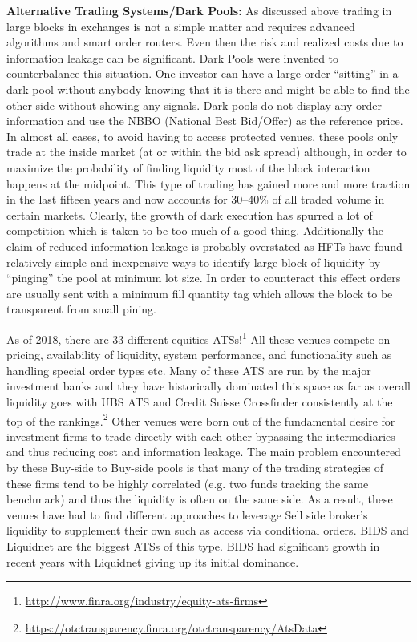 \noindent\textbf{Alternative Trading Systems/Dark Pools:} As discussed above trading in large blocks in exchanges is not a simple matter and requires advanced algorithms and smart order routers. Even then the risk and realized costs due to information leakage can be significant. Dark Pools were invented to counterbalance this situation. One investor can have a large order ``sitting'' in a dark pool without anybody knowing that it is there and might be able to find the other side without showing any signals. Dark pools do not display any order information and use the NBBO (National Best Bid/Offer) as the reference price. In almost all cases, to avoid having to access protected venues, these pools only trade at the inside market (at or within the bid ask spread) although, in order to maximize the probability of finding liquidity most of the block interaction happens at the midpoint. This type of trading has gained more and more traction in the last fifteen years and now accounts for 30--40\% of all traded volume in certain markets. Clearly, the growth of dark execution has spurred a lot of competition which is taken to be too much of a good thing. Additionally the claim of reduced information leakage is probably overstated as HFTs have found relatively simple and inexpensive ways to identify large block of liquidity by ``pinging'' the pool at minimum lot size. In order to counteract this effect orders are usually sent with a minimum fill quantity tag which allows the block to be transparent from small pining.

As of 2018, there are 33 different equities ATSs!\footnote{\url{http://www.finra.org/industry/equity-ats-firms}} All these venues compete on pricing, availability of liquidity, system performance, and functionality such as handling special order types etc. Many of these ATS are run by the major investment banks and they have historically dominated this space as far as overall liquidity goes with UBS ATS and Credit Suisse Crossfinder consistently at the top of the rankings.\footnote{\url{https://otctransparency.finra.org/otctransparency/AtsData}} Other venues were born out of the fundamental desire for investment firms to trade directly with each other bypassing the intermediaries and  thus reducing cost and information leakage.  The main problem encountered by these Buy-side to Buy-side pools is that many of the trading strategies of these firms tend to be highly correlated (e.g. two funds tracking the same benchmark) and thus the liquidity is often on the same side. As a result, these venues have had to find different approaches to leverage Sell side broker's liquidity to supplement their own such as access via conditional orders. BIDS and Liquidnet are the biggest ATSs of this type. BIDS had significant growth in recent years with Liquidnet giving up its initial dominance.

